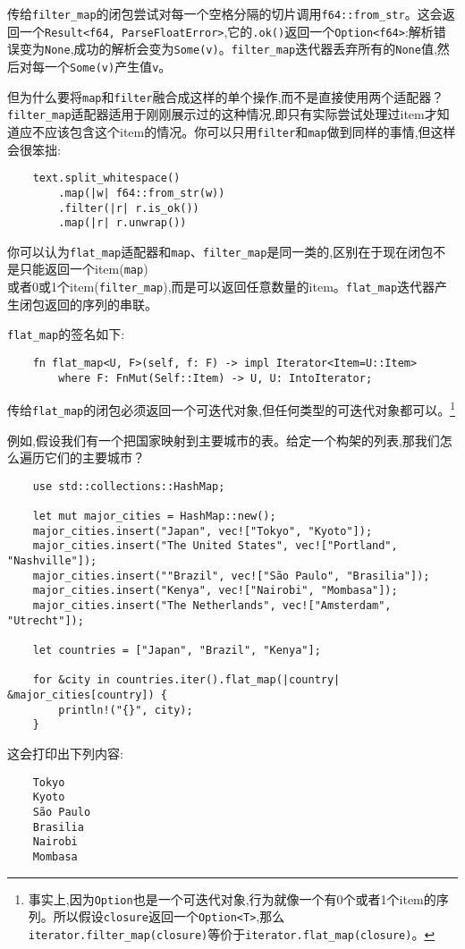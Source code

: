 传给\texttt{filter\_map}的闭包尝试对每一个空格分隔的切片调用\texttt{f64::from\_str}。这会返回一个\texttt{Result<f64, ParseFloatError>},它的\texttt{.ok()}返回一个\texttt{Option<f64>}:解析错误变为\texttt{None},成功的解析会变为\texttt{Some(v)}。\texttt{filter\_map}迭代器丢弃所有的\texttt{None}值,然后对每一个\texttt{Some(v)}产生值\texttt{v}。

但为什么要将\texttt{map}和\texttt{filter}融合成这样的单个操作,而不是直接使用两个适配器？\texttt{filter\_map}适配器适用于刚刚展示过的这种情况,即只有实际尝试处理过item才知道应不应该包含这个item的情况。你可以只用\texttt{filter}和\texttt{map}做到同样的事情,但这样会很笨拙:
\begin{verbatim}
    text.split_whitespace()
        .map(|w| f64::from_str(w))
        .filter(|r| r.is_ok())
        .map(|r| r.unwrap())
\end{verbatim}

你可以认为\texttt{flat\_map}适配器和\texttt{map}、\texttt{filter\_map}是同一类的,区别在于现在闭包不是只能返回一个item(\texttt{map})\\
或者0或1个item(\texttt{filter\_map}),而是可以返回任意数量的item。\texttt{flat\_map}迭代器产生闭包返回的序列的串联。

\texttt{flat\_map}的签名如下:
\begin{verbatim}
    fn flat_map<U, F>(self, f: F) -> impl Iterator<Item=U::Item>
        where F: FnMut(Self::Item) -> U, U: IntoIterator;
\end{verbatim}
传给\texttt{flat\_map}的闭包必须返回一个可迭代对象,但任何类型的可迭代对象都可以。\footnote{事实上,因为\texttt{Option}也是一个可迭代对象,行为就像一个有0个或者1个item的序列。所以假设\texttt{closure}返回一个\texttt{Option<T>},那么\texttt{iterator.filter\_map(closure)}等价于\texttt{iterator.flat\_map(closure)}。}

例如,假设我们有一个把国家映射到主要城市的表。给定一个构架的列表,那我们怎么遍历它们的主要城市？
\begin{verbatim}
    use std::collections::HashMap;

    let mut major_cities = HashMap::new();
    major_cities.insert("Japan", vec!["Tokyo", "Kyoto"]);
    major_cities.insert("The United States", vec!["Portland", "Nashville"]);
    major_cities.insert(""Brazil", vec!["São Paulo", "Brasilia"]);
    major_cities.insert("Kenya", vec!["Nairobi", "Mombasa"]);
    major_cities.insert("The Netherlands", vec!["Amsterdam", "Utrecht"]);

    let countries = ["Japan", "Brazil", "Kenya"];

    for &city in countries.iter().flat_map(|country| &major_cities[country]) {
        println!("{}", city);
    }
\end{verbatim}
这会打印出下列内容:
\begin{verbatim}
    Tokyo
    Kyoto
    São Paulo
    Brasilia
    Nairobi
    Mombasa
\end{verbatim}

